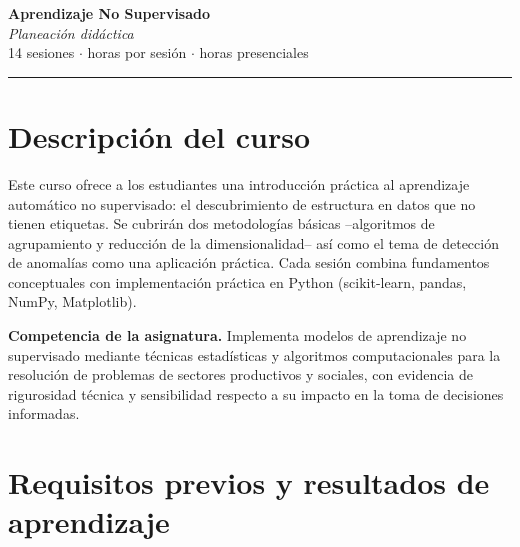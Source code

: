 \documentclass[11pt,letterpaper]{article}
\begin{document}
\begin{center}
  {\color{marino}\fontsize{28}{32}\selectfont\bfseries Aprendizaje No Supervisado}\\[10pt]
  {\color{azul}\Large\itshape Planeación didáctica}\\[10pt]
  {\large 14 sesiones \;$\cdot$ horas por sesión \;$\cdot$ horas presenciales}\\[-4pt]
  {\color{azul}\rule{\textwidth}{0.8pt}}
\end{center}

\section{Descripción del curso}

Este curso ofrece a los estudiantes una introducción práctica al aprendizaje automático no supervisado: el descubrimiento de estructura en datos que no tienen etiquetas. Se cubrirán dos metodologías básicas --algoritmos de agrupamiento y reducción de la dimensionalidad-- así como el tema de detección de anomalías como una aplicación práctica. Cada sesión combina fundamentos conceptuales con implementación práctica en Python (scikit-learn, pandas, NumPy, Matplotlib).

\textbf{Competencia de la asignatura.} Implementa modelos de aprendizaje no
supervisado mediante técnicas estadísticas y algoritmos computacionales para la
resolución de problemas de sectores productivos y sociales, con evidencia de
rigurosidad técnica y sensibilidad respecto a su impacto en la toma de
decisiones informadas.

\section{Requisitos previos y resultados de aprendizaje}
\end{document}
